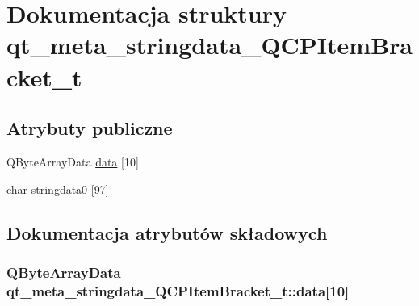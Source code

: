 \hypertarget{structqt__meta__stringdata___q_c_p_item_bracket__t}{}\section{Dokumentacja struktury qt\+\_\+meta\+\_\+stringdata\+\_\+\+Q\+C\+P\+Item\+Bracket\+\_\+t}
\label{structqt__meta__stringdata___q_c_p_item_bracket__t}
\subsection*{Atrybuty publiczne}
\begin{DoxyCompactItemize}
\item 
Q\+Byte\+Array\+Data \hyperlink{structqt__meta__stringdata___q_c_p_item_bracket__t_a43e94e3d311baab0f40ef38c9a1869b9}{data} \mbox{[}10\mbox{]}
\item 
char \hyperlink{structqt__meta__stringdata___q_c_p_item_bracket__t_a69c4efac85336d82d66b351f29e79864}{stringdata0} \mbox{[}97\mbox{]}
\end{DoxyCompactItemize}


\subsection{Dokumentacja atrybutów składowych}
\subsubsection[{\texorpdfstring{data}{data}}]{\setlength{\rightskip}{0pt plus 5cm}Q\+Byte\+Array\+Data qt\+\_\+meta\+\_\+stringdata\+\_\+\+Q\+C\+P\+Item\+Bracket\+\_\+t\+::data\mbox{[}10\mbox{]}}\hypertarget{structqt__meta__stringdata___q_c_p_item_bracket__t_a43e94e3d311baab0f40ef38c9a1869b9}{}\label{structqt__meta__stringdata___q_c_p_item_bracket__t_a43e94e3d311baab0f40ef38c9a1869b9}
